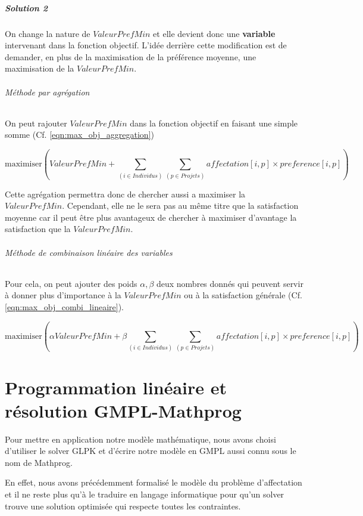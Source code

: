 \documentclass{polytech/polytech}
\begin{document}
\paragraph{Solution 2}
On change la nature de $ValeurPrefMin$ et elle devient donc une \textbf{variable} intervenant dans la fonction objectif.
L'idée derrière cette modification est de demander, en plus de la maximisation de la préférence moyenne, une maximisation de la $ValeurPrefMin$.

\subparagraph{Méthode par agrégation}
On peut rajouter $ValeurPrefMin$ dans la fonction objectif en faisant une simple somme (Cf. \eqref{eqn:max_obj_aggregation})

\begin{equation}
\label{eqn:max_obj_aggregation}
\text{maximiser} \left( ValeurPrefMin + \sum_{(i \in Individus)} \sum_{(p\in Projets)} affectation[i,p]\times preference[i,p] \right)
\end{equation}

Cette agrégation permettra donc de chercher aussi a maximiser la $ValeurPrefMin$. Cependant, elle ne le sera pas au même titre que la satisfaction moyenne car il peut être plus avantageux de chercher à maximiser d'avantage la satisfaction que la $ValeurPrefMin$.

\subparagraph{Méthode de combinaison linéaire des variables}
Pour cela, on peut ajouter des poids $\alpha, \beta$ deux nombres donnés qui peuvent servir à donner plus d'importance à la $ValeurPrefMin$ ou à la satisfaction générale (Cf. \eqref{eqn:max_obj_combi_lineaire}).

\begin{equation}
\label{eqn:max_obj_combi_lineaire}
\text{maximiser} \left( \alpha ValeurPrefMin + \beta \sum_{(i \in Individus)} \sum_{(p\in Projets)} affectation[i,p]\times preference[i,p] \right)
\end{equation}



\chapter{Programmation linéaire et résolution GMPL-Mathprog}

Pour mettre en application notre modèle mathématique, nous avons choisi d'utiliser le solver GLPK et d'écrire notre modèle en GMPL aussi connu sous le nom de Mathprog.

En effet, nous avons précédemment formalisé le modèle du problème d'affectation et il ne reste plus qu'à le traduire en langage informatique pour qu'un solver trouve une solution optimisée qui respecte toutes les contraintes.
\end{document}
